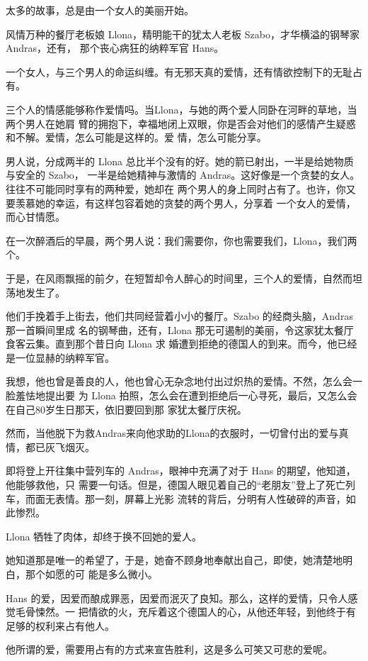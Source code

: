 		太多的故事，总是由一个女人的美丽开始。

		风情万种的餐厅老板娘 Llona，精明能干的犹太人老板 Szabo，才华横溢的钢琴家 Andras，还有，
	那个丧心病狂的纳粹军官 Hans。

		一个女人，与三个男人的命运纠缠。有无邪天真的爱情，还有情欲控制下的无耻占有。

		三个人的情感能够称作爱情吗。当Llona，与她的两个爱人同卧在河畔的草地，当两个男人在她肩
	臂的拥抱下，幸福地闭上双眼，你是否会对他们的感情产生疑惑和不解。爱情，怎么可能是这样的。爱
	情，怎么可能分享。

		男人说，分成两半的 Llona 总比半个没有的好。她的箭已射出，一半是给她物质与安全的 Szabo，
	一半是给她精神与激情的 Andras。这好像是一个贪婪的女人。往往不可能同时享有的两种爱，她却在
	两个男人的身上同时占有了。也许，你又要羡慕她的幸运，有这样包容着她的贪婪的两个男人，分享着
	一个女人的爱情，而心甘情愿。

		在一次醉酒后的早晨，两个男人说：我们需要你，你也需要我们，Llona，我们两个。

		于是，在风雨飘摇的前夕，在短暂却令人醉心的时间里，三个人的爱情，自然而坦荡地发生了。

		他们手挽着手上街去，他们共同经营着小小的餐厅。Szabo 的经商头脑，Andras 那一首瞬间里成
	名的钢琴曲，还有，Llona 那无可遏制的美丽，令这家犹太餐厅食客云集。直到那个昔日向 Llona 求
	婚遭到拒绝的德国人的到来。而今，他已经是一位显赫的纳粹军官。

		我想，他也曾是善良的人，他也曾心无杂念地付出过炽热的爱情。不然，怎么会一脸羞怯地提出要
	为 Llona 拍照，怎么会在遭到拒绝后一心寻死，最后，又怎么会在自己80岁生日那天，依旧要回到那
	家犹太餐厅庆祝。

		然而，当他脱下为救Andras来向他求助的Llona的衣服时，一切曾付出的爱与真情，都已灰飞烟灭。

		即将登上开往集中营列车的 Andras，眼神中充满了对于 Hans 的期望，他知道，他能够救他，只
	需要一句话。但是，德国人眼见着自己的“老朋友”登上了死亡列车，而面无表情。那一刻，屏幕上光影
	流转的背后，分明有人性破碎的声音，如此惨烈。

		Llona 牺牲了肉体，却终于换不回她的爱人。

		她知道那是唯一的希望了，于是，她奋不顾身地奉献出自己，即使，她清楚地明白，那个如愿的可
	能是多么微小。

		Hans 的爱，因爱而酿成罪恶，因爱而泯灭了良知。那么，这样的爱情，只令人感觉毛骨悚然。一
	把情欲的火，充斥着这个德国人的心，从他还年轻，到他终于有足够的权利来占有他人。

		他所谓的爱，需要用占有的方式来宣告胜利，这是多么可笑又可悲的爱呢。

